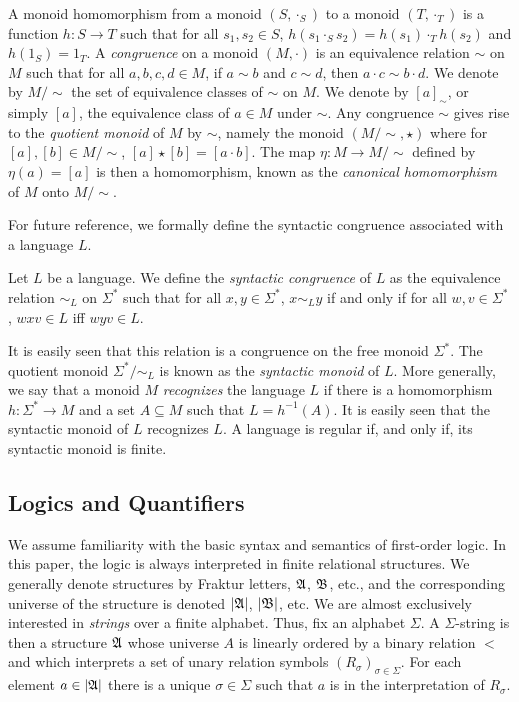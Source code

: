 \documentclass[a4paper,UKenglish,cleveref, autoref, thm-restate, anonymous]{lipics-v2021}
\begin{document}
A monoid homomorphism from a monoid $(S, \cdot_S)$ to a monoid $(T, \cdot_T)$ is a function $h : S \rightarrow T$ such that for all $s_1, s_2 \in S$, $h(s_1 \cdot_S s_2) = h(s_1) \cdot_T h(s_2)$ and $h(1_S) = 1_T$.     A \emph{congruence} on a monoid $(M, \cdot)$ is an equivalence relation $\sim$ on $M$ such that for all $a,b,c,d \in M$, if $a \sim b$ and $c \sim d$, then $a \cdot c \sim b \cdot d$.  We denote by $M/{\sim}$ the set of equivalence classes of $\sim$ on $M$.  We denote by $[a]_{\sim}$, or simply $[a]$, the equivalence class of $a \in M$ under $\sim$.  Any congruence $\sim$ gives rise to the \emph{quotient monoid} of $M$ by $\sim$, namely the monoid $(M/{\sim}, \star)$ where for $[a],[b] \in M/{\sim}$, $[a] \star [b] = [a \cdot b]$.  The map $\eta : M \rightarrow M/{\sim}$ defined by $\eta(a) = [a]$ is then a homomorphism, known as the  \emph{canonical homomorphism} of $M$ onto $M/{\sim}$.

For future reference, we formally define the syntactic congruence associated with a language $L$.
\begin{definition}\label{def:syncong}
    Let $L$ be a language. We define the \emph{syntactic congruence} of $L$ as the equivalence relation $\sim_L$ on $\Sigma^*$ such that for all $x, y \in \Sigma^*$, $x \sim_L y$ if and only if for all $w,v \in \Sigma^*$, $wxv \in L$ iff $wyv \in L$.
  \end{definition}
 It is easily seen that this relation is a congruence on the free monoid $\Sigma^*$.  The quotient monoid $\Sigma^*/{\sim_L}$ is known as the \emph{syntactic monoid} of $L$.  More generally, we say that a monoid $M$ \emph{recognizes} the language $L$ if there is a homomorphism $h: \Sigma^* \rightarrow M$ and a set $A \subseteq M$ such that $L = h^{-1}(A)$.  It is easily seen that the syntactic monoid of $L$ recognizes $L$.  A language is regular if, and only if, its syntactic monoid is finite.

\subsection{Logics and Quantifiers}\label{sec:backgroundmult}

We assume familiarity with the basic syntax and semantics of first-order logic.  In this paper, the logic is always interpreted in finite relational structures.  We generally denote structures by Fraktur letters, $\mathfrak{A}$, $\mathfrak{B}$, etc., and the corresponding universe of the structure is denoted $|\mathfrak{A}|$, $|\mathfrak{B}|$, etc.
We are almost exclusively interested in \emph{strings} over a finite alphabet.  Thus, fix an alphabet $\Sigma$.  A $\Sigma$-string is then a structure $\mathfrak{A}$ whose universe $A$ is linearly ordered by a binary relation $<$ and which interprets a set of unary relation symbols $(R_{\sigma})_{\sigma \in \Sigma}$.  For each element $a \in |\mathfrak{A}|$ there is a unique $\sigma \in \Sigma$ such that $a$ is in the interpretation of $R_{\sigma}$.
\end{document}

